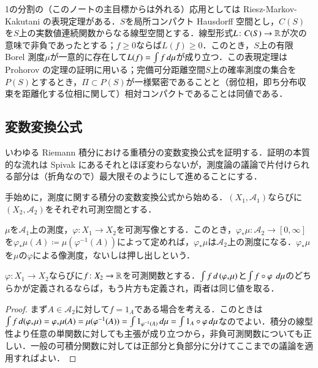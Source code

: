\begin{que}[**]
1の分割の（このノートの主目標からは外れる）応用としては Riesz-Markov-Kakutani の表現定理がある．$S$を局所コンパクト Hausdorff 空間とし，$C(S)$を$S$上の実数値連続関数からなる線型空間とする．線型形式$L \colon C(S) \to \mathbb{R}$が次の意味で非負であったとする；$f \geq 0$ならば$L(f) \geq 0$．このとき，$S$上の有限 Borel 測度$\mu$が一意的に存在して$L(f) = \int f \mathop{}\!d \mu$が成り立つ．この表現定理は Prohorov の定理の証明に用いる；完備可分距離空間$S$上の確率測度の集合を$P(S)$とするとき，$\Pi \subset P(S)$が一様緊密であることと（弱位相，即ち分布収束を距離化する位相に関して）相対コンパクトであることは同値である．
\end{que}

\subsection{変数変換公式}

いわゆる Riemann 積分における重積分の変数変換公式を証明する．証明の本質的な流れは Spivak にあるそれとほぼ変わらないが，測度論の議論で片付けられる部分は（折角なので）最大限そのようにして進めることにする．

手始めに，測度に関する積分の変数変換公式から始める．$(X_1, \mathcal{A}_1)$ならびに$(X_2, \mathcal{A}_2)$をそれぞれ可測空間とする．

\begin{defi}
$\mu$を$\mathcal{A}_1$上の測度，$\varphi \colon X_1 \to X_2$を可測写像とする．このとき，$\varphi_* \mu \colon \mathcal{A}_2 \to [0,\infty]$を$\varphi_* \mu (A) \coloneqq \mu(\varphi^{-1}(A))$によって定めれば，$\varphi_* \mu$は$\mathcal{A}_2$上の測度になる．$\varphi_* \mu$を$\mu$の$\varphi$による像測度，ないしは押し出しという．
\end{defi}

\begin{thm}[変数変換公式]$\varphi \colon X_1 \to X_2$ならびに$f \colon X_2 \to \mathbb{R}$を可測関数とする．$\int f \mathop{}\!d\left(\varphi_* \mu \right)$と$\int f \circ \varphi \ \mathop{}\!d \mu$のどちらかが定義されるならば，もう片方も定義され，両者は同じ値を取る．
\end{thm}

\begin{proof}
まず$A \in \mathcal{A}_2$に対して$f = 1_A$である場合を考える．このときは$\int f \mathop{}\!d (\varphi_* \mu) = \varphi_* \mu(A) = \mu(\varphi^{-1}(A)) = \int 1_{\varphi^{-1}(A)} \mathop{}\!d\mu = \int 1_A \circ \varphi \mathop{}\!d\mu$なのでよい．積分の線型性より任意の単関数に対しても主張が成り立つから，非負可測関数についても正しい．一般の可積分関数に対しては正部分と負部分に分けてここまでの議論を適用すればよい．
\end{proof}

